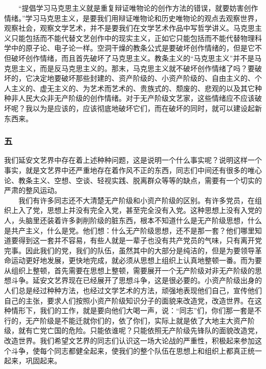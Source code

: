 \documentclass[cn,11pt,chinese]{elegantbook}
\def\myformat#1{\hfil\hfil #1}
\begin{document}
　　“提倡学习马克思主义就是重复辩证唯物论的创作方法的错误，就要妨害创作情绪。”学习马克思主义，是要我们用辩证唯物论和历史唯物论的观点去观察世界，观察社会，观察文学艺术，并不是要我们在文学艺术作品中写哲学讲义。马克思主义只能包括而不能代替文艺创作中的现实主义，正如它只能包括而不能代替物理科学中的原子论、电子论一样。空洞干燥的教条公式是要破坏创作情绪的，但是它不但破坏创作情绪，而且首先破坏了马克思主义。教条主义的“马克思主义”并不是马克思主义，而是反马克思主义的。那末，马克思主义就不破坏创作情绪了吗？要破坏的，它决定地要破坏那些封建的、资产阶级的、小资产阶级的、自由主义的、个人主义的、虚无主义的、为艺术而艺术的、贵族式的、颓废的、悲观的以及其它种种非人民大众非无产阶级的创作情绪。对于无产阶级文艺家，这些情绪应不应该破坏呢？我以为是应该的，应该彻底地破坏它们，而在破坏的同时，就可以建设起新东西来。\\
\subsubsection*{\myformat{五}}
我们延安文艺界中存在着上述种种问题，这是说明一个什么事实呢？说明这样一个事实，就是文艺界中还严重地存在着作风不正的东西，同志们中间还有很多的唯心论、教条主义、空想、空谈、轻视实践、脱离群众等等的缺点，需要有一个切实的严肃的整风运动。\\
　　我们有许多同志还不大清楚无产阶级和小资产阶级的区别。有许多党员，在组织上入了党，思想上并没有完全入党，甚至完全没有入党。这种思想上没有入党的人，头脑里还装着许多剥削阶级的脏东西，根本不知道什么是无产阶级思想，什么是共产主义，什么是党。他们想：什么无产阶级思想，还不是那一套？他们哪里知道要得到这一套并不容易，有些人就是一辈子也没有共产党员的气味，只有离开党完事。因此我们的党，我们的队伍，虽然其中的大部分是纯洁的，但是为要领导革命运动更好地发展，更快地完成，就必须从思想上组织上认真地整顿一番。而为要从组织上整顿，首先需要在思想上整顿，需要展开一个无产阶级对非无产阶级的思想斗争。延安文艺界现在已经展开了思想斗争，这是很必要的。小资产阶级出身的人们总是经过种种方法，也经过文学艺术的方法，顽强地表现他们自己，宣传他们自己的主张，要求人们按照小资产阶级知识分子的面貌来改造党，改造世界。在这种情形下，我们的工作，就是要向他们大喝一声，说：“同志”们，你们那一套是不行的，无产阶级是不能迁就你们的，依了你们，实际上就是依了大地主大资产阶级，就有亡党亡国的危险。只能依谁呢？只能依照无产阶级先锋队的面貌改造党，改造世界。我们希望文艺界的同志们认识这一场大论战的严重性，积极起来参加这个斗争，使每个同志都健全起来，使我们的整个队伍在思想上和组织上都真正统一起来，巩固起来。\\
\end{document}
